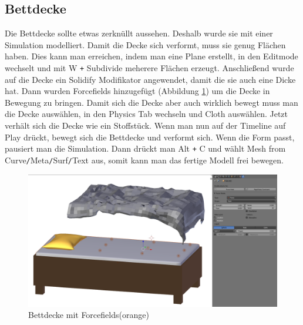 \subsection{Bettdecke}
Die Bettdecke sollte etwas zerknüllt aussehen. Deshalb wurde sie mit einer Simulation modelliert. Damit die Decke sich verformt, muss sie genug Flächen haben.
Dies kann man erreichen, indem man eine Plane erstellt, in den Editmode wechselt und mit W \verb-+- Subdivide meherere Flächen erzeugt. Anschließend wurde auf die Decke ein Solidify Modifikator
angewendet, damit die sie auch eine Dicke hat.
Dann wurden Forcefields hinzugefügt (Abbildung \ref{Bettdecke:image1}) um die Decke in Bewegung zu bringen. Damit sich die Decke aber auch wirklich bewegt muss man die Decke auswählen,
in den Physics Tab wechseln und Cloth auswählen. Jetzt verhält sich die Decke wie ein Stoffstück. Wenn man nun auf der Timeline auf Play drückt, bewegt sich die Bettdecke und verformt sich.
Wenn die Form passt, pausiert man die Simulation. Dann drückt man Alt \verb-+- C und wählt Mesh from Curve\verb-/-Meta\verb-/-Surf\verb-/-Text aus, somit kann man das fertige Modell
frei bewegen.

\begin{figure}[h]
    \centering
    \includegraphics[width=.8\textwidth]{images/Bettdecke_Forcefields.png}
    \caption{Bettdecke mit Forcefields(orange)}
    \label{Bettdecke:image1}
\end{figure}
